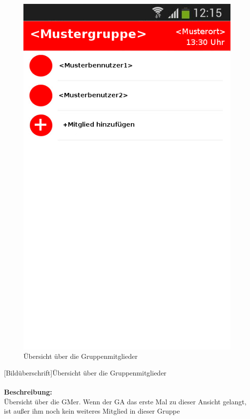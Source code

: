 \begin{figure} [H]
	\caption{Übersicht über die Gruppenmitglieder}
\begin{center}
	\includegraphics[scale =0.5]{resources/images/gruppendetails_Admin.png}
\end{center}
\end{figure}
[Bildüberschrift]Übersicht über die Gruppenmitglieder\\ \\
\textbf{Beschreibung:}\\
Übersicht über die GMer. Wenn der GA das erste Mal zu dieser Ansicht gelangt, ist außer ihm noch kein weiteres Mitglied in dieser Gruppe\\
